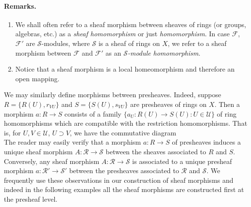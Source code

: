\paragraph{Remarks.}
\begin{enumerate}
\item We shall often refer to a sheaf morphism between sheaves of rings (or groups, algebras, etc.) as a \emph{sheaf homomorphism} or just \emph{homomorphism}. In case $\mathcal F$, $\mathcal F'$ are $\mathcal S$-modules, where $\mathcal S$ is a sheaf of rings on $X$, we refer to a sheaf morphism between $\mathcal F$ and $\mathcal F'$ as an \emph{$\mathcal S$-module homomorphism}.
\item Notice that a sheaf morphism is a local homeomorphism and therefore an open mapping.
\end{enumerate}
We may similarly define morphisms between presheaves. Indeed, suppose $R=\{R(U),r_{VU}\}$ and $S=\{S(U),s_{VU}\}$ are presheaves of rings on $X$. Then a morphism $a:R\to S$ consists of a family $\{a_U:R(U)\to S(U):U\in\mathcal U\}$ of ring homomorphisms which are compatible with the restriction homomorphisms. That is, for $U,V\in\mathcal U$, $U\supset V$, we have the commutative diagram
\[

\]
The reader may easily verify that a morphism $a:R\to S$ of presheaves induces a unique sheaf morphism $A:\mathcal R\to\mathcal S$ between the sheaves associated to $R$ and $S$. Conversely, any sheaf morphism $A:\mathcal R\to\mathcal S$ is associated to a unique presheaf morphism $a:\mathcal R'\to\mathcal S'$ between the presheaves associated to $\mathcal R$ and $\mathcal S$. We frequently use these observations in our construction of sheaf morphisms and indeed in the following examples all the sheaf morphisms are constructed first at the presheaf level.

